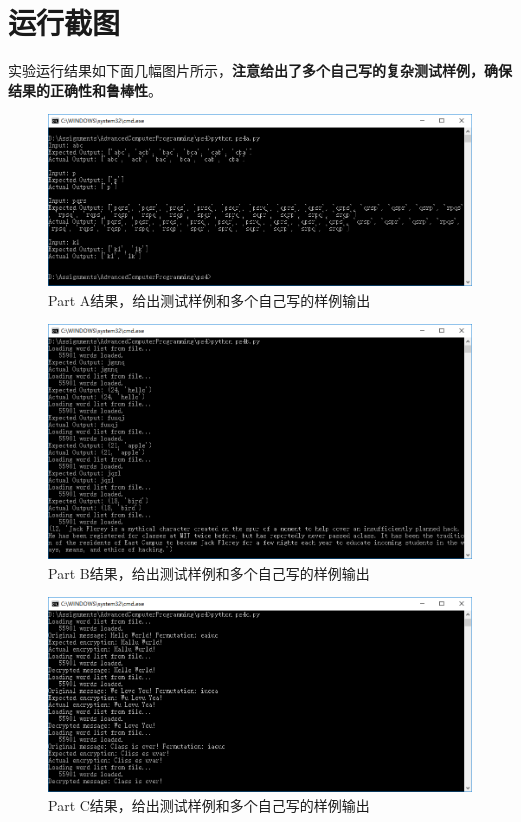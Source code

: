 \documentclass[logo,reportComp]{thesis}
\begin{document}
\section{运行截图}
实验运行结果如下面几幅图片所示，\textbf{注意给出了多个自己写的复杂测试样例，确保结果的正确性和鲁棒性}。
\begin{figure}[H]
\centering
\includegraphics[width=\linewidth]{fig/permutation.PNG}
\caption{Part A结果，给出测试样例和多个自己写的样例输出}
\end{figure}
\begin{figure}[H]
\centering
\includegraphics[width=\linewidth]{fig/partb.PNG}
\caption{Part B结果，给出测试样例和多个自己写的样例输出}
\end{figure}
\begin{figure}[H]
\centering
\includegraphics[width=\linewidth]{fig/partc.PNG}
\caption{Part C结果，给出测试样例和多个自己写的样例输出}
\end{figure}
\end{document}
